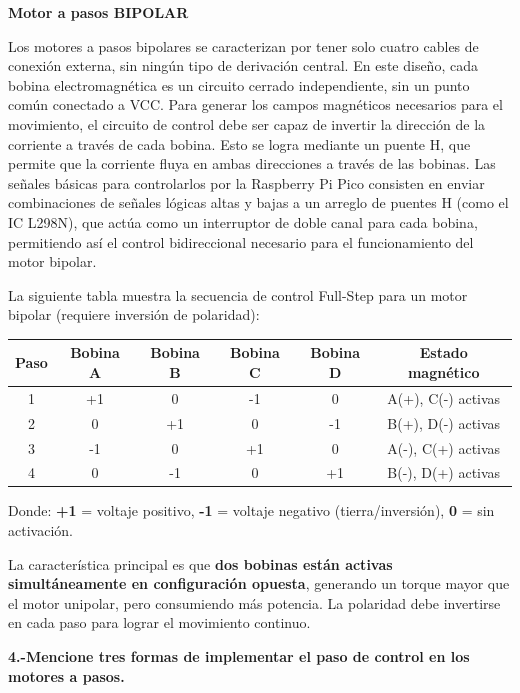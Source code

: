\documentclass[letterpaper,12pt]{article}
\begin{document}
    \textbf{Motor a pasos BIPOLAR}

    Los motores a pasos bipolares se caracterizan por tener solo cuatro cables de conexión externa, sin ningún tipo de derivación central.
    En este diseño, cada bobina electromagnética es un circuito cerrado independiente, sin un punto común conectado a VCC.
    Para generar los campos magnéticos necesarios para el movimiento, el circuito de control debe ser capaz de invertir la dirección de la corriente a través de cada bobina.
    Esto se logra mediante un puente H, que permite que la corriente fluya en ambas direcciones a través de las bobinas. Las señales básicas para controlarlos por la Raspberry Pi Pico consisten en enviar combinaciones de señales lógicas altas y bajas a un arreglo de puentes H (como el IC L298N),
    que actúa como un interruptor de doble canal para cada bobina, permitiendo así el control bidireccional necesario para el funcionamiento del motor bipolar.

    La siguiente tabla muestra la secuencia de control Full-Step para un motor bipolar (requiere inversión de polaridad):

    \begin{center}
    \begin{tabular}{|c|c|c|c|c|c|}
    \hline
    \textbf{Paso} & \textbf{Bobina A} & \textbf{Bobina B} & \textbf{Bobina C} & \textbf{Bobina D} & \textbf{Estado magnético} \\
    \hline
    1 & +1 & 0 & -1 & 0 & A(+), C(-) activas \\
    \hline
    2 & 0 & +1 & 0 & -1 & B(+), D(-) activas \\
    \hline
    3 & -1 & 0 & +1 & 0 & A(-), C(+) activas \\
    \hline
    4 & 0 & -1 & 0 & +1 & B(-), D(+) activas \\
    \hline
    \end{tabular}
    \end{center}

    Donde: \textbf{+1} = voltaje positivo, \textbf{-1} = voltaje negativo (tierra/inversión), \textbf{0} = sin activación.

    La característica principal es que \textbf{dos bobinas están activas simultáneamente en configuración opuesta}, generando un torque mayor que el motor unipolar, pero consumiendo más potencia. La polaridad debe invertirse en cada paso para lograr el movimiento continuo.
    
    \noindent\textbf{4.-Mencione tres formas de implementar el paso de control en los motores a pasos.}
\end{document}

